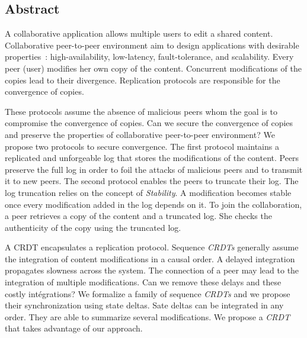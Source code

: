 \begin{ThesisAbstract}
\subsection*{\centering Abstract}

A collaborative application allows multiple users to edit a shared content.
Collaborative peer-to-peer environment aim to design applications with desirable properties~: high-availability, low-latency, fault-tolerance, and scalability.
Every peer (user) modifies her own copy of the content.
Concurrent modifications of the copies lead to their divergence.
Replication protocols are responsible for the convergence of copies.

These protocols assume the absence of malicious peers whom the goal is to compromise the convergence of copies.
Can we secure the convergence of copies and preserve the properties of collaborative peer-to-peer environment?
We propose two protocols to secure convergence.
The first protocol maintains a replicated and unforgeable log that stores the modifications of the content.
Peers preserve the full log in order to foil the attacks of malicious peers and to transmit it to new peers.
The second protocol enables the peers to truncate their log.
The log truncation relies on the concept of \emph{Stability}.
A modification becomes stable once every modification added in the log depends on it.
To join the collaboration, a peer retrieves a copy of the content and a truncated log.
She checks the authenticity of the copy using the truncated log.


A \acf{CRDT} encapsulates a replication protocol.
Sequence \emph{CRDTs} generally assume the integration of content modifications in a causal order.
A delayed integration propagates slowness across the system.
The connection of a peer may lead to the integration of multiple modifications.
Can we remove these delays and these costly intégrations?
We formalize a family of sequence \emph{CRDTs} and we propose their synchronization using state deltas.
Sate deltas can be integrated in any order.
They are able to summarize several modifications.
We propose a \emph{CRDT} that takes advantage of our approach.


\end{ThesisAbstract}



